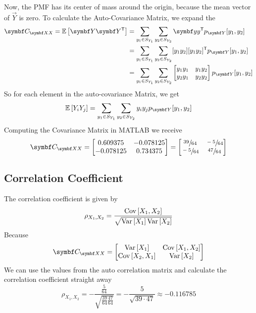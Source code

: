 Now, the PMF has its center of mass around the origin, because the mean vector of $\vec{Y}$ is zero. To calculate the Auto-Covariance Matrix, we expand the 
\begin{align*}
    \mat{C}_{\vec{XX}} = \E{\vec{Y}\vec{Y^{\T}}}
    &= \sum_{y_1 \in S_{Y_1}}\sum_{y_2 \in S_{Y_2}} \vec{yy}^\T p_{\vec{Y}}[y_1,y_2] \\
    &= \sum_{y_1 \in S_{Y_1}}\sum_{y_2 \in S_{Y_2}} [y_1 y_2][y_1 y_2]^\T p_{\vec{Y}}[y_1,y_2] \\
    &= \sum_{y_1 \in S_{Y_1}}\sum_{y_2 \in S_{Y_2}} \begin{bmatrix}
        y_1y_1 & y_1y_2 \\ y_2y_1 & y_2y_2
    \end{bmatrix} p_{\vec{Y}}[y_1,y_2] 
\end{align*}
So for each element in the auto-covariance Matrix, we get
\[
    \E{Y_i Y_j} = \sum_{y_1 \in S_{Y_1}}\sum_{y_2 \in S_{Y_2}} y_i y_j p_{\vec{Y}}[y_1,y_2]
\]
Computing the Covariance Matrix in MATLAB we receive
\begin{equation}
    \mat{C}_{\vec{XX}} = \begin{bmatrix}
        0.609375 & -0.078125 \\
        -0.078125 & 0.734375
    \end{bmatrix} = \begin{bmatrix}
        \sfrac{39}{64} & \sfrac{-5}{64} \\
        \sfrac{-5}{64} & \sfrac{47}{64}
    \end{bmatrix}
\end{equation}

\subsection{Correlation Coefficient}

The correlation coefficient is given by 
\begin{equation}
    \rho_{X_1,X_2} = \frac{\mathrm{Cov}\left[X_1,X_2\right]}{\sqrt{\mathrm{Var}\left[X_1\right]\mathrm{Var}\left[X_2\right]}}
\end{equation}
Because 
\begin{equation}
    \mat{C}_{\vec{XX}} = \begin{bmatrix}
        \Var{X_1} & \Cov{X_1}{X_2} \\
        \Cov{X_2}{X_1} & \Var{X_2}
    \end{bmatrix}
\end{equation}
We can use the values from the auto correlation matrix and calculate the correlation coefficient straight away
\[
    \rho_{X_1,X_2} = -\frac{\tfrac{5}{64}}{\sqrt{\tfrac{39}{64}\tfrac{47}{64}}} = -\frac{5}{\sqrt{39\cdot47}} \approx -0.116785
\]